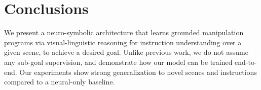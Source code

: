 \section{Conclusions}
We present a neuro-symbolic architecture that learns grounded manipulation programs via visual-linguistic reasoning for instruction understanding over a given scene, to achieve a desired goal. Unlike previous work, we do not assume any sub-goal supervision, and demonstrate how our model can be trained end-to-end. Our experiments show strong generalization to novel scenes and instructions compared to a neural-only baseline.

